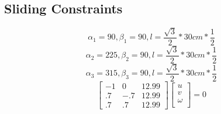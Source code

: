 \subsection{Sliding Constraints}
$$
\alpha_1 =  90, 
\beta_1 = 90,
l = \dfrac{\sqrt{3}}{2} * 30cm * \dfrac{1}{2}
$$
$$
\alpha_2 =  225, 
\beta_2 = 90,
l = \dfrac{\sqrt{3}}{2} * 30cm * \dfrac{1}{2}
$$
$$
\alpha_3 =  315, 
\beta_3 = 90,
l = \dfrac{\sqrt{3}}{2} * 30cm * \dfrac{1}{2}
$$
$$
\begin{bmatrix} 
-1 & 0 & 12.99\\
.7 & -.7 & 12.99\\
.7 & .7 & 12.99
\end{bmatrix} 
\begin{bmatrix} 
u \\
v \\
\omega \\
\end{bmatrix} 
= 
0
$$

